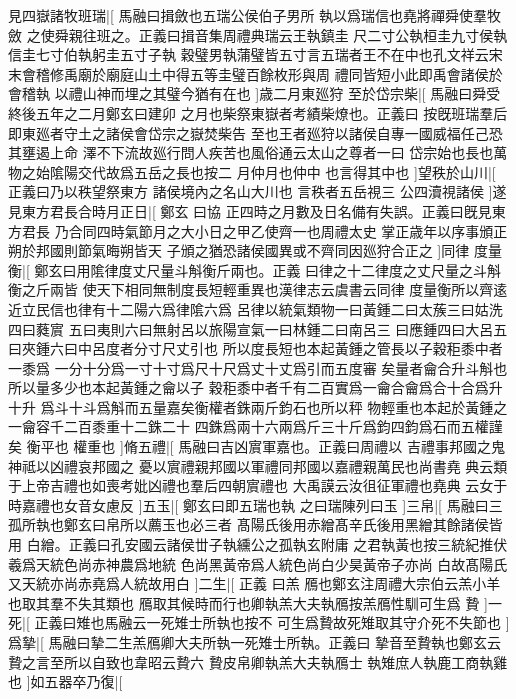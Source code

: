 %
見四嶽諸牧班瑞|[%
馬融曰揖斂也五瑞公侯伯子男所%
執以爲瑞信也堯將禪舜使羣牧斂%
%
之使舜親往班之。正義曰揖音集周禮典瑞云王執鎮圭%
尺二寸公執桓圭九寸侯執信圭七寸伯執躬圭五寸子執%
%
穀璧男執蒲璧皆五寸言五瑞者王不在中也孔文祥云宋%
末會稽修禹廟於廟庭山土中得五等圭璧百餘枚形與周%
%
禮同皆短小此即禹會諸侯於會稽執%
以禮山神而埋之其璧今猶有在也%
]歳二月東廵狩%
%
至於岱宗柴|[%
馬融曰舜受終後五年之二月鄭玄曰建卯%
之月也柴祭東嶽者考績柴燎也。正義曰%
%
按旣班瑞羣后即東廵者守土之諸侯會岱宗之嶽焚柴告%
至也王者廵狩以諸侯自專一國威福任己恐其壅遏上命%
%
澤不下流故廵行問人疾苦也風俗通云太山之尊者一曰%
岱宗始也長也萬物之始隂陽交代故爲五岳之長也按二%
%
月仲月也仲中%
也言得其中也%
]望秩於山川|[%
正義曰乃以秩望祭東方%
諸侯境內之名山大川也%
%
言秩者五岳視三%
公四瀆視諸侯%
]遂見東方君長合時月正日|[%
鄭玄%
曰協%
%
正四時之月數及日名備有失誤。正義曰旣見東方君長%
乃合同四時氣節月之大小日之甲乙使齊一也周禮太史%
%
掌正歳年以序事頒正朔於邦國則節氣晦朔皆天%
子頒之猶恐諸侯國異或不齊同因廵狩合正之%
]同律%
%
度量衡|[%
鄭玄曰用隂律度丈尺量斗斛衡斤兩也。正義%
曰律之十二律度之丈尺量之斗斛衡之斤兩皆%
%
使天下相同無制度長短輕重異也漢律志云虞書云同律%
度量衡所以齊逺近立民信也律有十二陽六爲律隂六爲%
%
呂律以統氣類物一曰黃鍾二曰太蔟三曰姑洗四曰蕤賔%
五曰夷則六曰無射呂以旅陽宣氣一曰林鍾二曰南呂三%
%
曰應鍾四曰大呂五曰夾鍾六曰中呂度者分寸尺丈引也%
所以度長短也本起黃鍾之管長以子穀秬黍中者一黍爲%
%
一分十分爲一寸十寸爲尺十尺爲丈十丈爲引而五度審%
矣量者龠合升斗斛也所以量多少也本起黃鍾之龠以子%
%
穀秬黍中者千有二百實爲一龠合龠爲合十合爲升十升%
爲斗十斗爲斛而五量嘉矣衡權者銖兩斤鈞石也所以秤%
%
物輕重也本起於黃鍾之一龠容千二百黍重十二銖二十%
四銖爲兩十六兩爲斤三十斤爲鈞四鈞爲石而五權謹矣%
%
衡平也%
權重也%
]脩五禮|[%
馬融曰吉凶賔軍嘉也。正義曰周禮以%
吉禮事邦國之鬼神祗以凶禮哀邦國之%
%
憂以賔禮親邦國以軍禮同邦國以嘉禮親萬民也尚書堯%
典云類于上帝吉禮也如喪考妣凶禮也羣后四朝賔禮也%
%
大禹謨云汝徂征軍禮也堯典%
云女于時嘉禮也女音女慮反%
]五玉|[%
鄭玄曰即五瑞也執%
之曰瑞陳列曰玉%
%
]三帛|[%
馬融曰三孤所執也鄭玄曰帛所以薦玉也必三者%
髙陽氏後用赤繒髙辛氏後用黑繒其餘諸侯皆用%
%
白繒。正義曰孔安國云諸侯丗子執纁公之孤執玄附庸%
之君執黃也按三統紀推伏羲爲天統色尚赤神農爲地統%
%
色尚黑黃帝爲人統色尚白少昊黃帝子亦尚%
白故髙陽氏又天統亦尚赤堯爲人統故用白%
]二生|[%
正義%
曰羔%
%
鴈也鄭玄注周禮大宗伯云羔小羊也取其羣不失其類也%
鴈取其候時而行也卿執羔大夫執鴈按羔鴈性馴可生爲%
%
贄%
]一死|[%
正義曰雉也馬融云一死雉士所執也按不%
可生爲贄故死雉取其守介死不失節也%
]爲摯|[%
%
馬融曰摯二生羔鴈卿大夫所執一死雉士所執。正義曰%
摯音至贄執也鄭玄云贄之言至所以自致也韋昭云贄六%
%
贄皮帛卿執羔大夫執鴈士%
執雉庶人執鹿工商執雞也%
]如五器卒乃復|[%
